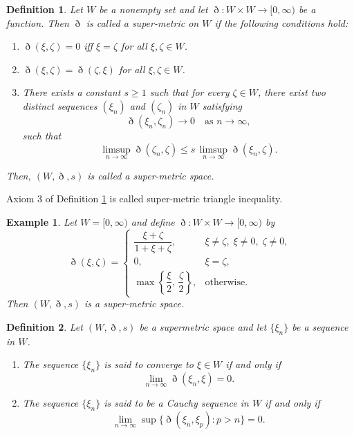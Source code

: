 \documentclass[pdflatex,sn-mathphys-num]{sn-jnl}%
\theoremstyle{thmstyleone}%
\theoremstyle{thmstyletwo}%
\newtheorem{example}{Example}%
\theoremstyle{thmstylethree}%
\newtheorem{definition}{Definition}%
\begin{document}
\begin{definition}\cite{super metric}\label{sms}
Let $W$ be a nonempty set and let $\eth : W \times W \to [0,\infty)$ be a function. 
Then $\eth$ is called a \emph{super-metric} on $W$ if the following conditions hold:
\begin{enumerate}
    \item  $\eth(\xi,\zeta)=0$ iff $\xi =\zeta $ for all $\xi,\zeta \in W$.
    \item $\eth(\xi,\zeta)=\eth(\zeta ,\xi)$ for all $\xi,\zeta \in W$.
    \item There exists a constant $s \ge 1$ such that for every $\zeta \in  W$, there exist two distinct sequences $(\xi_n)$ and $(\zeta_n)$ in $W$ satisfying
    \[
    \eth(\xi_n,\zeta_n) \to 0 \quad \text{as } n \to \infty,
    \]
    such that
    \[
    \limsup_{n\to\infty} \eth(\zeta_n,\zeta)
    \le
    s \, \limsup_{n\to\infty} \eth(\xi_n,\zeta).
    \]
\end{enumerate}
Then, $(W,\eth,s)$ is called a \emph{super-metric space}.
\end{definition}
Axiom 3 of Definition \ref{sms} is called super-metric triangle inequality.
\begin{example}\cite{super metric}
Let $W=[0,\infty)$ and define $\eth : W \times W \to [0,\infty)$ by
\[
\eth(\xi,\zeta)=
\begin{cases}
\dfrac{\xi+\zeta }{1+\xi+\zeta }, & \xi \neq \zeta,\; \xi\neq 0,\; \zeta \neq 0, \\[6pt]
0, & \xi =\zeta , \\[6pt]
\max\!\left\{\dfrac{\xi }{2},\,\dfrac{\zeta }{2}\right\}, & \text{otherwise}.
\end{cases}
\]
Then $(W,\eth,s)$ is a super-metric space.
\end{example}

\begin{definition}\cite{super metric1}
Let $(W,\eth,s)$ be a supermetric space and let $\{\xi_n\}$ be a sequence in $W$.
\begin{enumerate}
    \item[(i)] The sequence $\{\xi_n\}$ is said to converge to $\xi \in W$ 
    if and only if
    \[
    \lim_{n \to \infty} \eth(\xi_n,\xi) = 0.
    \]

    \item[(ii)] The sequence $\{\xi_n\}$ is said to be a Cauchy sequence in $W$ 
    if and only if
    \[
    \lim_{n \to \infty} \sup \{ \eth(\xi_n,\xi_p) : p > n \} = 0.
    \]
\end{enumerate}
\end{definition}
\end{document}
